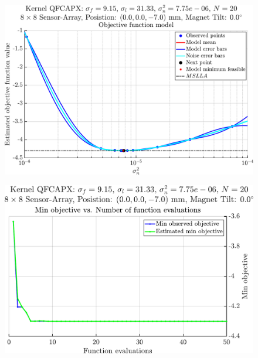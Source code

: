 \documentclass{beamer}
\begin{document}
\begin{frame}
\begin{figure}
\includegraphics[width=\linewidth]{images/bayes-opt}
\end{figure}
\end{frame}

\begin{frame}
\begin{figure}
\includegraphics[width=\linewidth]{images/bayes-runs}
\end{figure}
\end{frame}
\end{document}

